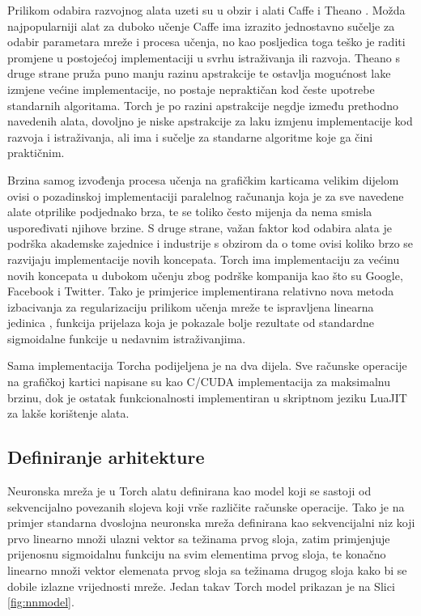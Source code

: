 \documentclass[lmodern, utf8, diplomski, numeric]{fer}
\begin{document}
Prilikom odabira razvojnog alata uzeti su u obzir i alati Caffe i Theano \cite{jia2014caffe}\cite{bergstra2010theano}. Možda najpopularniji alat za duboko učenje Caffe ima izrazito jednostavno sučelje za odabir parametara mreže i procesa učenja, no kao posljedica toga teško je raditi promjene u postojećoj implementaciji u svrhu istraživanja ili razvoja. Theano s druge strane pruža puno manju razinu apstrakcije te ostavlja mogućnost lake izmjene većine implementacije, no postaje nepraktičan kod česte upotrebe standarnih algoritama.
Torch je po razini apstrakcije negdje između prethodno navedenih alata, dovoljno je niske apstrakcije za laku izmjenu implementacije kod razvoja i istraživanja, ali ima i sučelje za standarne algoritme koje ga čini praktičnim. 

Brzina samog izvođenja procesa učenja na grafičkim karticama velikim dijelom ovisi o pozadinskoj implementaciji paralelnog računanja koja je za sve navedene alate otprilike podjednako brza, te se toliko često mijenja da nema smisla uspoređivati njihove brzine. S druge strane, važan faktor kod odabira alata je podrška akademske zajednice i industrije s obzirom da o tome ovisi koliko brzo se razvijaju implementacije novih koncepata. Torch ima implementaciju za većinu novih koncepata u dubokom učenju zbog podrške kompanija kao što su Google, Facebook i Twitter.  Tako je primjerice implementirana relativno nova metoda izbacivanja \cite{hinton2014dropout} za regularizaciju prilikom učenja mreže te ispravljena linearna jedinica , funkcija prijelaza koja je pokazale bolje rezultate od standardne sigmoidalne funkcije u nedavnim istraživanjima.

Sama implementacija Torcha podijeljena je na dva dijela. Sve računske operacije na grafičkoj kartici napisane su kao C/CUDA implementacija za maksimalnu brzinu, dok je ostatak funkcionalnosti implementiran u skriptnom jeziku LuaJIT za lakše korištenje alata.  

\subsection{Definiranje arhitekture}
	
Neuronska mreža je u Torch alatu definirana kao model koji se sastoji od sekvencijalno povezanih slojeva koji vrše različite računske operacije.
Tako je na primjer standarna dvoslojna neuronska mreža definirana kao sekvencijalni niz koji prvo linearno množi ulazni vektor sa težinama prvog sloja, zatim primjenjuje prijenosnu sigmoidalnu funkciju na svim elementima prvog sloja, te konačno linearno množi vektor elemenata prvog sloja sa težinama drugog sloja kako bi se dobile izlazne vrijednosti mreže. Jedan takav Torch model prikazan je na Slici \ref{fig:nnmodel}.
\end{document}
